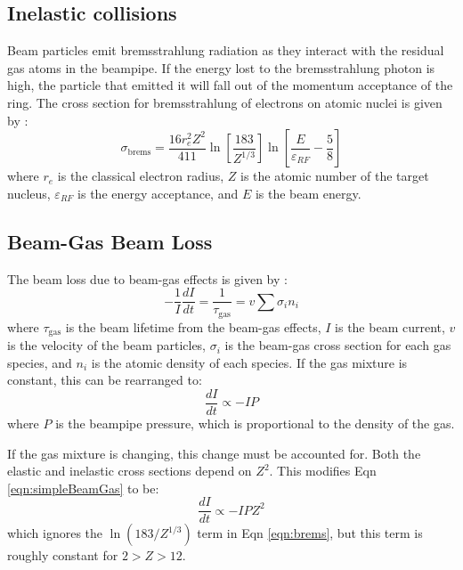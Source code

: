 \subsection{Inelastic collisions}
\label{sec:brem}

	Beam particles emit bremsstrahlung radiation as they interact with the residual gas atoms in the beampipe. If the energy lost to the bremsstrahlung photon is high, the particle that emitted it will fall out of the momentum acceptance of the ring. The cross section for bremsstrahlung of electrons on atomic nuclei is given by \cite{moller1999beam, Marin:1999ss}:
\begin{equation}
	{\sigma_{\mathrm{brems}}=\frac{16r_e^2Z^2}{411}\ln\left [ \frac{183}{Z^{1/3}} \right ]\ln\left [ \frac{E}{\varepsilon _{RF}}-\frac{5}{8} \right ]}
	\label{eqn:brems}
\end{equation} 
where $r_e$ is the classical electron radius, $Z$ is the atomic number of the target nucleus, $\varepsilon _{RF}$ is the energy acceptance, and $E$ is the beam energy.

\subsection{Beam-Gas Beam Loss}

	The beam loss due to beam-gas effects is given by \cite{moller1999beam, malyshev2012gas}:
\begin{equation}
	{-\frac{1}{I}\frac{dI}{dt}=\frac{1}{\tau_{\mathrm{gas}}} = v\sum \sigma_{i} n_{i}}
\end{equation}
where $\tau_{\mathrm{gas}}$ is the beam lifetime from the beam-gas effects, $I$ is the beam current, $v$ is the velocity of the beam particles, $\sigma_{i}$ is the beam-gas cross section for each gas species, and $n_i$ is the atomic density of each species. If the gas mixture is constant, this can be rearranged to:
\begin{equation}
	{\frac{dI}{dt}\propto - I P}
	\label{eqn:simpleBeamGas}
\end{equation}
where $P$ is the beampipe pressure, which is proportional to the density of the gas.

If the gas mixture is changing, this change must be accounted for. Both the elastic and inelastic cross sections depend on $Z^2$. This modifies Eqn \ref{eqn:simpleBeamGas} to be:
\begin{equation}
	{\frac{dI}{dt}\propto  - I P Z^{2}}
	\label{eqn:complexBeamGas}
\end{equation}
which ignores the $\ln(183/Z^{1/3})$ term in Eqn \ref{eqn:brems}, but this term is roughly constant for $2>Z>12$.

